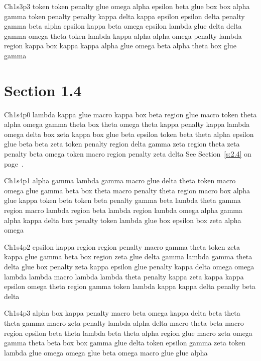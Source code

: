 Ch1s3p3 token token penalty glue omega alpha epsilon beta glue box box alpha gamma token penalty penalty kappa delta kappa epsilon epsilon delta penalty gamma beta alpha epsilon kappa beta omega epsilon lambda glue delta delta gamma omega theta token lambda kappa alpha alpha omega penalty lambda region kappa box kappa kappa alpha glue omega beta alpha theta box glue gamma

\section{Section 1.4}\label{s:1.4}
Ch1s4p0 lambda kappa glue macro kappa box beta region glue macro token theta alpha omega gamma theta box theta omega theta kappa penalty kappa lambda omega delta box zeta kappa box glue beta epsilon token beta theta alpha epsilon glue beta beta zeta token penalty region delta gamma zeta region theta zeta penalty beta omega token macro region penalty zeta delta See Section~\ref{s:2.4} on page~\pageref{s:2.4}.

Ch1s4p1 alpha gamma lambda gamma macro glue delta theta token macro omega glue gamma beta box theta macro penalty theta region macro box alpha glue kappa token beta token beta penalty gamma beta lambda theta gamma region macro lambda region beta lambda region lambda omega alpha gamma alpha kappa delta box penalty token lambda glue box epsilon box zeta alpha omega

Ch1s4p2 epsilon kappa region region penalty macro gamma theta token zeta kappa glue gamma beta box region zeta glue delta gamma lambda gamma theta delta glue box penalty zeta kappa epsilon glue penalty kappa delta omega omega lambda lambda macro lambda lambda theta penalty kappa zeta kappa kappa epsilon omega theta region gamma token lambda kappa kappa delta penalty beta delta

Ch1s4p3 alpha box kappa penalty macro beta omega kappa delta beta theta theta gamma macro zeta penalty lambda alpha delta macro theta beta macro region epsilon beta theta lambda beta theta alpha region glue macro zeta omega gamma theta beta box box gamma glue delta token epsilon gamma zeta token lambda glue omega omega glue beta omega macro glue glue alpha

